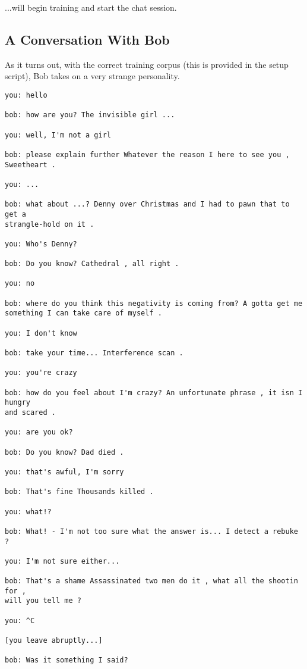 \documentclass[]{article}
\begin{document}
...will begin training and start the chat session.

\subsection{A Conversation With Bob}\label{sec:conv1}

As it turns out, with the correct training corpus (this is provided in the setup script), Bob takes on a very strange personality.

\begin{verbatim}
you: hello

bob: how are you? The invisible girl ...

you: well, I'm not a girl

bob: please explain further Whatever the reason I here to see you , Sweetheart .

you: ...

bob: what about ...? Denny over Christmas and I had to pawn that to get a 
strangle-hold on it .

you: Who's Denny?

bob: Do you know? Cathedral , all right .

you: no

bob: where do you think this negativity is coming from? A gotta get me 
something I can take care of myself .

you: I don't know

bob: take your time... Interference scan .

you: you're crazy

bob: how do you feel about I'm crazy? An unfortunate phrase , it isn I hungry 
and scared .

you: are you ok?

bob: Do you know? Dad died .

you: that's awful, I'm sorry

bob: That's fine Thousands killed .

you: what!?

bob: What! - I'm not too sure what the answer is... I detect a rebuke ?

you: I'm not sure either...

bob: That's a shame Assassinated two men do it , what all the shootin for , 
will you tell me ?

you: ^C

[you leave abruptly...]

bob: Was it something I said?
\end{verbatim}
\end{document}
